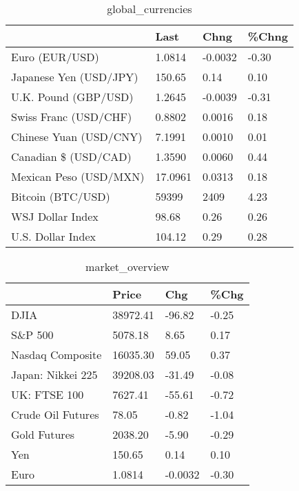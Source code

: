 \documentclass{article}%
\begin{document}
%


\begin{table}[htbp]%
\caption{global\_currencies}%
\centering%
\begin{adjustbox}{width=1\textwidth}%
\begin{tabular}{llll}
\toprule
                       &    Last &    Chng & \%Chng \\
\midrule
        Euro (EUR/USD) &  1.0814 & -0.0032 & -0.30 \\
Japanese Yen (USD/JPY) &  150.65 &    0.14 &  0.10 \\
  U.K. Pound (GBP/USD) &  1.2645 & -0.0039 & -0.31 \\
 Swiss Franc (USD/CHF) &  0.8802 &  0.0016 &  0.18 \\
Chinese Yuan (USD/CNY) &  7.1991 &  0.0010 &  0.01 \\
  Canadian \$ (USD/CAD) &  1.3590 &  0.0060 &  0.44 \\
Mexican Peso (USD/MXN) & 17.0961 &  0.0313 &  0.18 \\
     Bitcoin (BTC/USD) &   59399 &    2409 &  4.23 \\
      WSJ Dollar Index &   98.68 &    0.26 &  0.26 \\
     U.S. Dollar Index &  104.12 &    0.29 &  0.28 \\
\bottomrule
\end{tabular}
%
\end{adjustbox}%
\end{table}

%


\begin{table}[htbp]%
\caption{market\_overview}%
\centering%
\begin{adjustbox}{width=1\textwidth}%
\begin{tabular}{llll}
\toprule
                  &    Price &     Chg &  \%Chg \\
\midrule
             DJIA & 38972.41 &  -96.82 & -0.25 \\
          S\&P 500 &  5078.18 &    8.65 &  0.17 \\
 Nasdaq Composite & 16035.30 &   59.05 &  0.37 \\
Japan: Nikkei 225 & 39208.03 &  -31.49 & -0.08 \\
     UK: FTSE 100 &  7627.41 &  -55.61 & -0.72 \\
Crude Oil Futures &    78.05 &   -0.82 & -1.04 \\
     Gold Futures &  2038.20 &   -5.90 & -0.29 \\
              Yen &   150.65 &    0.14 &  0.10 \\
             Euro &   1.0814 & -0.0032 & -0.30 \\
\bottomrule
\end{tabular}
%
\end{adjustbox}%
\end{table}

%
\end{document}
